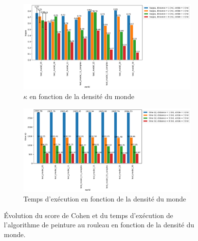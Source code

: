 \documentclass[francais,RandD]{rapportPFE}
\begin{document}
			\begin{figure}[h!]
				\centering
				\begin{subfigure}[t]{0.9\linewidth}
					\includegraphics[width=\linewidth]{graphics/ski_nordique-kappa_vs_world_for_each_d.png}
					\caption{$\kappa$ en fonction de la densité du monde}
					\label{fig:ski_nordique-kappa_vs_world_d}
				\end{subfigure}
				\hfill
				\begin{subfigure}[t]{0.9\linewidth}
						\includegraphics[width=\linewidth]{graphics/ski_nordique-time_vs_world_for_each_d.png}
						\caption{Temps d'exécution en fonction de la densité du monde}
						\label{fig:ski_nordique-time_vs_world_d}
				\end{subfigure}
				\caption{Évolution du score de Cohen et du temps d'exécution de l'algorithme de peinture au rouleau en fonction de la densité du monde.}
				\label{fig:ski_nordique-world_d}
			\end{figure}
\end{document}
